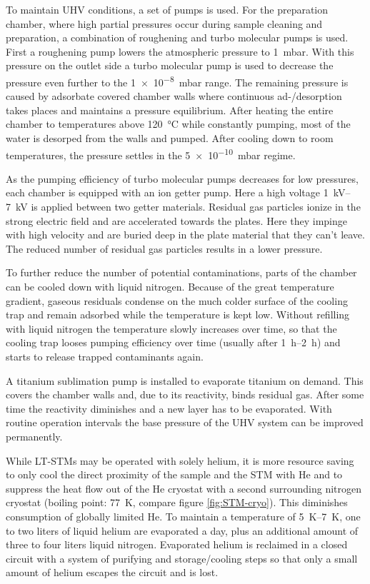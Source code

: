 To maintain UHV conditions, a set of pumps is used. For the preparation chamber, where high partial pressures occur during sample cleaning and preparation, a combination of roughening and turbo molecular pumps is used. First a roughening pump lowers the atmospheric pressure to \SI{1}{\milli \bar}. With this pressure on the outlet side a turbo molecular pump is used to decrease the pressure even further to the  \SI{1e-8}{\milli \bar} range. The remaining pressure is caused by adsorbate covered chamber walls where continuous ad-/desorption takes places and maintains a pressure equilibrium. After heating the entire chamber to temperatures above \SI{120}{\celsius} while constantly pumping, most of the water is desorped from the walls and pumped. After cooling down to room temperatures, the pressure settles in the \SI{5e-10}{\milli \bar} regime.

As the pumping efficiency of turbo molecular pumps decreases for low pressures, each chamber is equipped with an ion getter pump. Here a high voltage \SIrange{1}{7}{\kilo \volt} is applied between two getter materials. Residual gas particles ionize in the strong electric field and are accelerated towards the plates. Here they impinge with high velocity and are buried deep in the plate material that they can't leave. The reduced number of residual gas particles results in a lower pressure.

To further reduce the number of potential contaminations, parts of the chamber can be cooled down with liquid nitrogen. Because of the great temperature gradient, gaseous residuals condense on the much colder surface of the cooling trap and remain adsorbed while the temperature is kept low. Without refilling with liquid nitrogen the temperature slowly increases over time, so that the cooling trap looses pumping efficiency over time (usually after \SIrange{1}{2}{\hour}) and starts to release trapped contaminants again.

A titanium sublimation pump is installed to evaporate titanium on demand. This covers the chamber walls and, due to its reactivity, binds residual gas. After some time the reactivity diminishes and a new layer has to be evaporated. With routine operation intervals the base pressure of the UHV system can be improved permanently.

While LT-STMs may be operated with solely helium, it is more resource saving to only cool the direct proximity of the sample and the STM with He and to suppress the heat flow out of the He cryostat with a second surrounding nitrogen cryostat (boiling point: \SI{77}{\K}, compare figure \ref{fig:STM-cryo}). This diminishes consumption of globally limited He. To maintain a temperature of \SIrange{5}{7}{\K}, one to two liters of liquid helium are evaporated a day, plus an additional amount of three to four liters liquid nitrogen. Evaporated helium is reclaimed in a closed circuit with a system of purifying and storage/cooling steps so that only a small amount of helium escapes the circuit and is lost.

